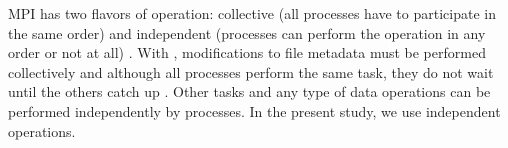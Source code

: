 MPI has two flavors of operation: collective (all processes have to participate in the same order) and independent (processes can perform the operation in any order or not at all) \cite{pythonhdf5}.
With , modifications to file metadata must be performed collectively and although all processes perform the same task, they do not wait until the others catch up \cite{pythonhdf5}. 
Other tasks and any type of data operations can be performed independently by processes.
In the present study, we use independent operations.
